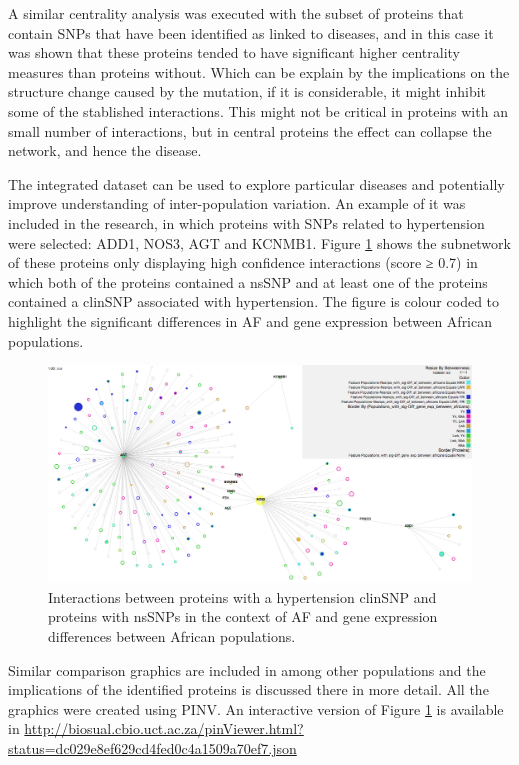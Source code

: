 A similar centrality analysis was executed with the subset of proteins that contain SNPs that have been identified as linked to diseases, and in this case it was shown that these proteins tended to have significant higher centrality measures than proteins without. Which can be explain by the implications on the structure change caused by the mutation, if it is considerable, it might inhibit some of the stablished interactions. This might not be critical in proteins with an small number of interactions, but in central proteins the effect can collapse the network, and hence the disease.

The integrated dataset can be used to explore particular diseases and potentially improve understanding of inter-population variation. An example of it was included in the research, in which proteins with SNPs related to hypertension were selected: ADD1, NOS3, AGT and KCNMB1. Figure \ref{fig:pinv_human_snps} shows the subnetwork of these proteins only displaying high confidence interactions (score ≥ 0.7) in which both of the proteins contained a nsSNP and at least one of the proteins contained a clinSNP associated with hypertension. The figure is colour coded to highlight the significant differences in AF and gene expression between African populations. 

\begin{figure}
\centering
\includegraphics[width=\textwidth]{figures/pinv_human_snps.png}
\caption[Interactions between proteins with a hypertension clinSNP]{Interactions between proteins with a hypertension clinSNP and proteins with nsSNPs in the context of AF and gene expression differences between African populations.
\label{fig:pinv_human_snps}}
\end{figure}

Similar comparison graphics are included in \cite{HEE2014} among other populations and the implications of the identified proteins is discussed there in more detail. All the graphics were created using PINV. An interactive version of Figure \ref{fig:pinv_human_snps} is available in \url{http://biosual.cbio.uct.ac.za/pinViewer.html?status=dc029e8ef629cd4fed0c4a1509a70ef7.json}


